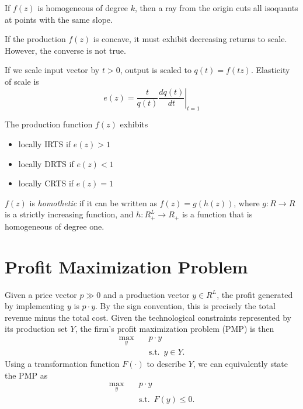 \documentclass[12pt,fleqn]{book} %
\begin{document}
\begin{proposition}
	If $f(z)$ is homogeneous of degree $k$, then a ray from the origin cuts all isoquants at points with the same slope.
\end{proposition}

\begin{proposition}
	If the production $f(z)$ is concave, it must exhibit decreasing returns to scale. However, the converse is not true.
\end{proposition}


\begin{definition}
	If we scale input vector by $t > 0$, output is scaled to $q(t)=f (tz)$. Elasticity of scale is
	\[
	e(z)=\left.\frac{t}{q(t)}\frac{dq(t)}{dt}\right|_{t=1}
	\]	
\end{definition}


\begin{definition}
	The	production function $f(z)$ exhibits
	\begin{itemize}
	\item locally IRTS if $e(z) > 1$
	\item locally DRTS if $e(z) < 1$	
	\item locally CRTS if $e(z) = 1$
	\end{itemize}
\end{definition}

\begin{definition}[Homotheticity]
	$f (z)$ is \emph{homothetic} if it can be written as $f (z) = g(h(z))$, where $g : R\rightarrow R$ is a strictly increasing function, and $h : R_+^L\rightarrow R_+$ is a function
	that is homogeneous of degree one.	
\end{definition}


\section{Profit Maximization Problem}
Given a price vector $p \gg 0$ and a production vector $y\in R^L$, the profit generated by implementing $y$ is $p\cdot y$. By the sign convention, this is precisely the total revenue minus the total cost. Given the technological constraints represented by its production set $Y$, the firm's profit maximization problem (PMP) is then
\begin{align*}
\max_{y} \quad &  p\cdot y\\
& \mathrm{s.t.}\ \; y\in Y.
\end{align*}
Using a transformation function $F(\cdot)$ to describe $Y$, we can equivalently state the PMP as
\begin{align*}
\max_{y} \quad &  p\cdot y\\
& \mathrm{s.t.}\ \; F(y)\le0.
\end{align*}
\end{document}

